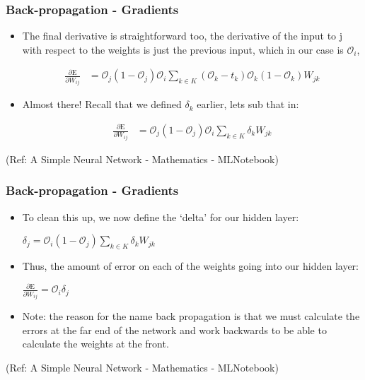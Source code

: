 \begin{frame}[fragile] \frametitle{Back-propagation - Gradients}

\begin{itemize}
\item The final derivative is straightforward too, the derivative of the input to j with respect to the weights is just the previous input, 
which in our case is $\mathcal{O}_{i}$,

\begin{align}
\frac{\partial{\text{E}}}{\partial{W_{ij}}} &= \mathcal{O}_{j} \left( 1 - \mathcal{O}_{j} \right)  \mathcal{O}_{i} \sum_{k \in K} \left( \mathcal{O}_{k} - t_{k} \right) \mathcal{O}_{k} \left( 1 - \mathcal{O}_{k} \right) W_{jk}
 \end{align}
 
\item Almost there! Recall that we defined $\delta_{k}$ earlier, lets sub that in:
 
\begin{align}
\frac{\partial{\text{E}}}{\partial{W_{ij}}} &= \mathcal{O}_{j} \left( 1 - \mathcal{O}_{j} \right)  \mathcal{O}_{i} \sum_{k \in K} \delta_{k} W_{jk}
 \end{align}
 
 
\end{itemize}

\tiny{(Ref: A Simple Neural Network - Mathematics - MLNotebook)}
\end{frame}


\begin{frame}[fragile] \frametitle{Back-propagation - Gradients}

\begin{itemize}
\item To clean this up, we now define the ‘delta’ for our hidden layer:

$\delta_{j} = \mathcal{O}_{i} \left( 1 - \mathcal{O}_{j} \right)   \sum_{k \in K} \delta_{k} W_{jk}$


\item Thus, the amount of error on each of the weights going into our hidden layer:

$\frac{\partial{\text{E}}}{\partial{W_{ij}}}  = \mathcal{O}_{i} \delta_{j}$

\item Note: the reason for the name back propagation is that we must calculate the errors at the far end of the network and work backwards to be able to calculate the weights at the front.


\end{itemize}

\tiny{(Ref: A Simple Neural Network - Mathematics - MLNotebook)}
\end{frame}


